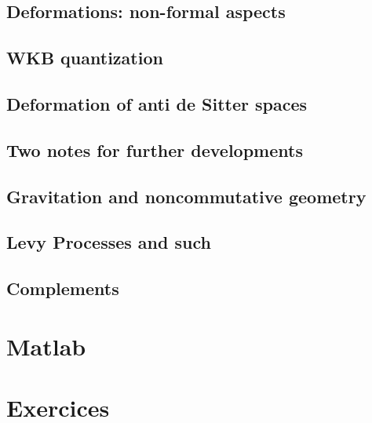 \chapter{Deformations: non-formal aspects}


      

\chapter{WKB quantization}


\chapter{Deformation of anti de Sitter spaces}   \label{ChDefoBH}


\chapter{Two notes for further developments}        \label{ChapNoteDev}



\chapter{Gravitation and noncommutative geometry}


\chapter{Levy Processes and such}


\chapter{Complements}









\part{Matlab}




\part{Exercices} 

